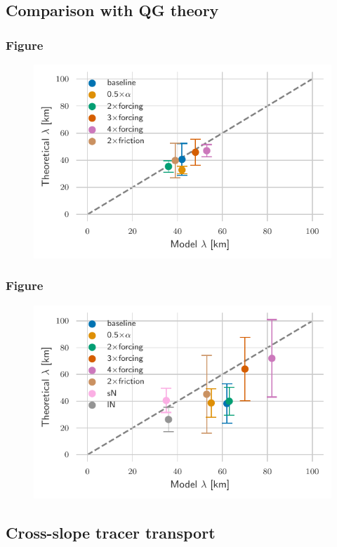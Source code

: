 \documentclass{beamer}
\begin{document}
\subsection{Comparison with QG theory}
\begin{frame}
\frametitle{Figure}
\begin{figure}
\centering
\includegraphics{figures/Unstratified_theoreticalVSmodel_wave_length.pdf}
\end{figure}
\end{frame}

\begin{frame}
\frametitle{Figure}
\begin{figure}
\centering
\includegraphics{figures/Stratified_theoreticalVSmodel_wave_length_xzshear.pdf}
\end{figure}
\end{frame}

\subsection{Cross-slope tracer transport}
\end{document}
